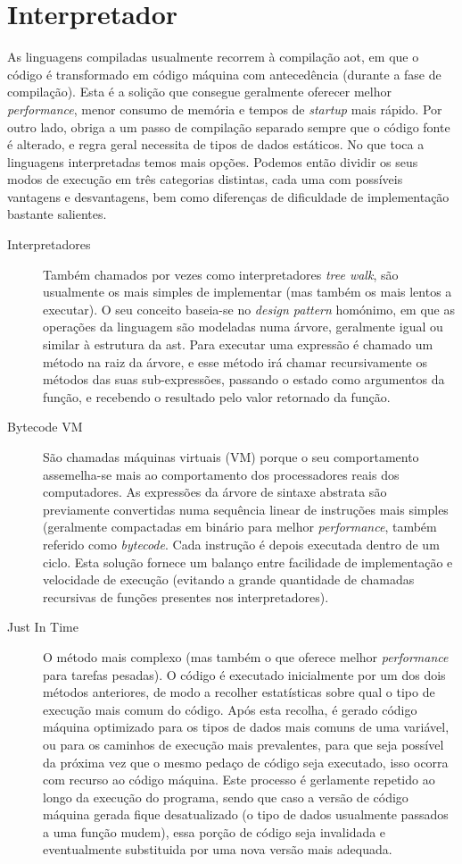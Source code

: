 \section{Interpretador}
As linguagens compiladas usualmente recorrem à compilação \acrfull{aot}, em que o código é transformado em código máquina com antecedência (durante a fase de compilação). Esta é a solição que consegue geralmente oferecer melhor \textit{performance}, menor consumo de memória e tempos de \textit{startup} mais rápido. Por outro lado, obriga a um passo de compilação separado sempre que o código fonte é alterado, e regra geral necessita de tipos de dados estáticos.
No que toca a linguagens interpretadas temos mais opções. Podemos então dividir os seus modos de execução em três categorias distintas, cada uma com possíveis vantagens e desvantagens, bem como diferenças de dificuldade de implementação bastante salientes.
\begin{description}
 \item[Interpretadores] Também chamados por vezes como interpretadores \textit{tree walk}, são usualmente os mais simples de implementar (mas também os mais lentos a executar). O seu conceito baseia-se no \textit{design pattern} homónimo, em que as operações da linguagem são modeladas numa árvore, geralmente igual ou similar à estrutura da \acrshort{ast}. Para executar uma expressão é chamado um método na raiz da árvore, e esse método irá chamar recursivamente os métodos das suas sub-expressões, passando o estado como argumentos da função, e recebendo o resultado pelo valor retornado da função.
 \item[Bytecode VM] São chamadas máquinas virtuais (VM) porque o seu comportamento assemelha-se mais ao comportamento dos processadores reais dos computadores. As expressões da árvore de sintaxe abstrata são previamente convertidas numa sequência linear de instruções mais simples (geralmente compactadas em binário para melhor \textit{performance}, também referido como \textit{bytecode}. Cada instrução é depois executada dentro de um ciclo. Esta solução fornece um balanço entre facilidade de implementação e velocidade de execução (evitando a grande quantidade de chamadas recursivas de funções presentes nos interpretadores).
 \item[Just In Time] O método mais complexo (mas também o que oferece melhor \textit{performance} para tarefas pesadas). O código é executado inicialmente por um dos dois métodos anteriores, de modo a recolher estatísticas sobre qual o tipo de execução mais comum do código. Após esta recolha, é gerado código máquina optimizado para os tipos de dados mais comuns de uma variável, ou para os caminhos de execução mais prevalentes, para que seja possível da próxima vez que o mesmo pedaço de código seja executado, isso ocorra com recurso ao código máquina. Este processo é gerlamente repetido ao longo da execução do programa, sendo que caso a versão de código máquina gerada fique desatualizado (o tipo de dados usualmente passados a uma função mudem), essa porção de código seja invalidada e eventualmente substituida por uma nova versão mais adequada.
 \end{description}

